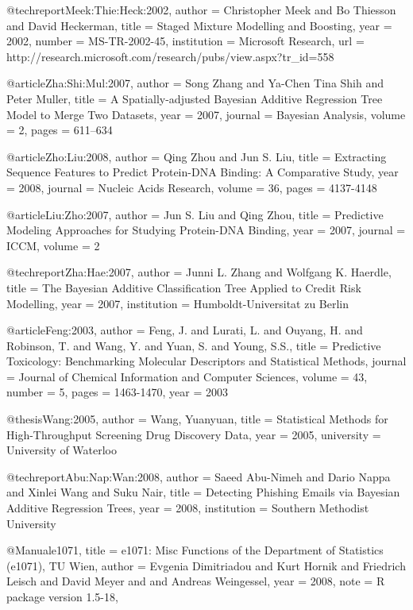 @techreport{Meek:Thie:Heck:2002,
    author = {Christopher Meek and Bo Thiesson and David Heckerman},
    title = {Staged Mixture Modelling and Boosting},
    year = {2002},
    number = {MS-TR-2002-45},
    institution = {Microsoft Research},
    url = {http://research.microsoft.com/research/pubs/view.aspx?tr_id=558}
}

@article{Zha:Shi:Mul:2007,
    author = {Song Zhang and Ya-Chen Tina Shih and Peter Muller},
    title = {A Spatially-adjusted {B}ayesian Additive Regression Tree Model to Merge Two Datasets},
    year = {2007},
    journal = {Bayesian Analysis},
    volume = {2},
    pages = {611--634}
}

@article{Zho:Liu:2008,
    author = {Qing Zhou and Jun S. Liu},
    title = {Extracting Sequence Features to Predict Protein-{DNA} Binding: A Comparative Study},
    year = {2008},
    journal = {Nucleic Acids Research},
    volume = {36},
    pages = {4137-4148}
}

@article{Liu:Zho:2007,
    author = {Jun S. Liu and Qing Zhou},
    title = {Predictive Modeling Approaches for Studying Protein-{DNA} Binding},
    year = {2007},
    journal = {ICCM},
    volume = {2}
}

@techreport{Zha:Hae:2007,
    author = {Junni L. Zhang and Wolfgang K. Haerdle},
    title = {The {B}ayesian Additive Classification Tree Applied to Credit Risk Modelling},
    year = {2007},
    institution = {Humboldt-Universitat zu Berlin}
}

@article{Feng:2003,
  author = {Feng, J. and Lurati, L. and Ouyang, H. and Robinson, T. and Wang,
Y. and Yuan, S. and Young, S.S.},
  title = {Predictive Toxicology: Benchmarking Molecular Descriptors and
Statistical Methods},
  journal = {Journal of Chemical Information and Computer Sciences},
  volume = {43},
  number = {5},
  pages = {1463-1470},
  year = {2003}
}

@thesis{Wang:2005,
    author = {Wang, Yuanyuan},
    title = {Statistical Methods for High-Throughput Screening Drug
Discovery Data},
    year = {2005},
    university = {University of Waterloo}
}

@techreport{Abu:Nap:Wan:2008,
 author = {Saeed Abu-Nimeh and Dario Nappa and Xinlei Wang and Suku Nair},
    title = {Detecting Phishing Emails via {B}ayesian Additive Regression Trees},
    year = {2008},
    institution = {Southern Methodist University}
}

@Manual{e1071,
    title = {e1071: Misc Functions of the Department of Statistics (e1071),
TU Wien},
    author = {Evgenia Dimitriadou and Kurt Hornik and Friedrich Leisch and
David Meyer and and Andreas Weingessel},
    year = {2008},
    note = {R package version 1.5-18},
  }

